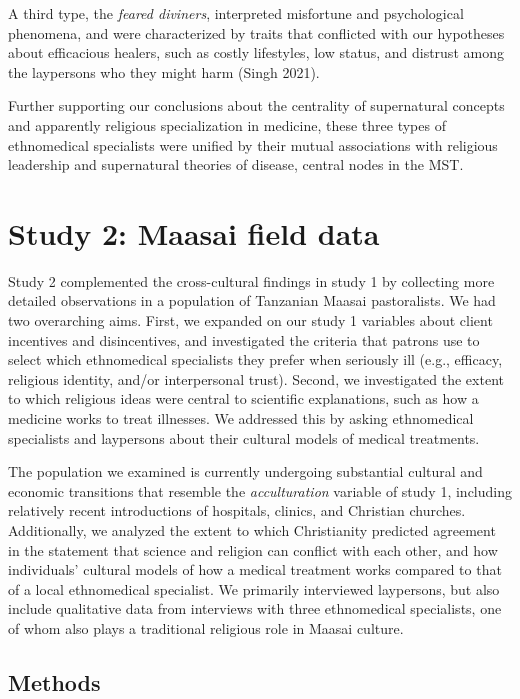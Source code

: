 \documentclass[
  11pt,
]{article}
\begin{document}
A third type, the \emph{feared diviners}, interpreted misfortune and psychological phenomena, and were characterized by traits that conflicted with our hypotheses about efficacious healers, such as costly lifestyles, low status, and distrust among the laypersons who they might harm (Singh 2021).

Further supporting our conclusions about the centrality of supernatural concepts and apparently religious specialization in medicine, these three types of ethnomedical specialists were unified by their mutual associations with religious leadership and supernatural theories of disease, central nodes in the MST.

\hypertarget{study-2-maasai-field-data}{%
\section{Study 2: Maasai field data}\label{study-2-maasai-field-data}}

Study 2 complemented the cross-cultural findings in study 1 by collecting more detailed observations in a population of Tanzanian Maasai pastoralists. We had two overarching aims. First, we expanded on our study 1 variables about client incentives and disincentives, and investigated the criteria that patrons use to select which ethnomedical specialists they prefer when seriously ill (e.g., efficacy, religious identity, and/or interpersonal trust). Second, we investigated the extent to which religious ideas were central to scientific explanations, such as how a medicine works to treat illnesses. We addressed this by asking ethnomedical specialists and laypersons about their cultural models of medical treatments.

The population we examined is currently undergoing substantial cultural and economic transitions that resemble the \emph{acculturation} variable of study 1, including relatively recent introductions of hospitals, clinics, and Christian churches. Additionally, we analyzed the extent to which Christianity predicted agreement in the statement that science and religion can conflict with each other, and how individuals' cultural models of how a medical treatment works compared to that of a local ethnomedical specialist. We primarily interviewed laypersons, but also include qualitative data from interviews with three ethnomedical specialists, one of whom also plays a traditional religious role in Maasai culture.

\hypertarget{methods-1}{%
\subsection{Methods}\label{methods-1}}
\end{document}
